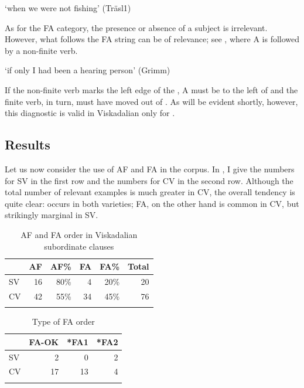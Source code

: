 \documentclass[output=paper,colorlinks,citecolor=brown,draft,draftmode]{langscibook}
\begin{document}
\glt `when we were not fishing’ (Träsl1)
\z

As for the FA category, the presence or absence of a subject is irrelevant. However, what follows the FA string can be of relevance; see , where A is followed by a non-finite verb.


\glt `if only I had been a hearing person’ (Grimm)
\z


If the non-finite verb marks the left edge of the , A must be to the left of  and the finite verb, in turn, must have moved out of . As will be evident shortly, however, this diagnostic is valid in Viskadalian only for .


\subsection{Results}\label{sec:petzell:2.4}


Let us now consider the use of AF and FA in the corpus. In , I give the numbers for SV in the first row and the numbers for CV in the second row. Although the total number of relevant examples is much greater in CV, the overall tendency is quite clear:  occurs in both varieties; FA, on the other hand is common in CV, but strikingly marginal in SV.


\begin{table}
\begin{tabular}{lrrrrr}
\lsptoprule
& AF & AF\% & FA & FA\% & Total\\\midrule
SV & 16 & 80\% & 4 & 20\% & 20\\
CV & 42 & 55\% & 34 & 45\% & 76\\
\lspbottomrule
\end{tabular}
\caption{\label{tab:petzell:1a}AF and FA order in Viskadalian subordinate clauses}
\end{table}

\begin{table}
\caption{\label{tab:petzell:1b}Type of FA order}
\begin{tabular}{lrrr}
\lsptoprule
& FA-OK & *FA1 & *FA2\\\midrule
SV & 2 & 0 & 2\\
CV & 17 & 13 & 4\\
\lspbottomrule
\end{tabular}
\end{table}
\end{document}

